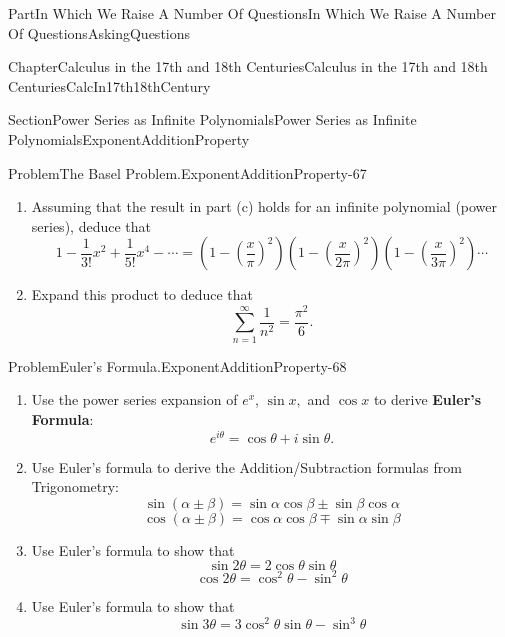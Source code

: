 \documentclass[oneside,10pt,]{book}
\newcommand{\terminology}[1]{\textbf{#1}}
\numberwithin{equation}{part}
\begin{document}
\begin{partptx}{Part}{In Which We Raise A Number Of Questions}{}{In Which We Raise A Number Of Questions}{}{}{AskingQuestions}
\begin{chapterptx}{Chapter}{Calculus in the 17th and 18th Centuries}{}{Calculus in the 17th and 18th Centuries}{}{}{CalcIn17th18thCentury}
\begin{sectionptx}{Section}{Power Series as Infinite Polynomials}{}{Power Series as Infinite Polynomials}{}{}{ExponentAdditionProperty}
\begin{problem}{Problem}{The Basel Problem.}{ExponentAdditionProperty-67}
\begin{enumerate}[font=\bfseries,label=(\alph*),ref=\alph*]
\begin{equation*}
p(x)=a_0\left(1-\frac{x}{r_1}\right)\left(1-\frac{x}{r_2}\right)\cdots\left(1-\frac{x}{r_n}\right)\text{.}
\end{equation*}
%
\item{}Assuming that the result in part (c) holds for an infinite polynomial (power series), deduce that%
\begin{equation*}
1-\frac{1}{3!}x^2+\frac{1}{5!}x^4-\cdots =
\left(1-\left(\frac{x}{\pi}\right)^2\right)
\left(1-\left(\frac{x}{2\pi}\right)^2\right)
\left(1-\left(\frac{x}{3\pi}\right)^2\right)\cdots
\end{equation*}
%
\item{}Expand this product to deduce that%
\begin{equation*}
\sum_{n=1}^\infty\frac{1}{n^2}=\frac{\pi^2}{6}.{}
\end{equation*}
%
\end{enumerate}%
\end{problem}
\begin{problem}{Problem}{Euler's Formula.}{ExponentAdditionProperty-68}%
\begin{enumerate}[font=\bfseries,label=(\alph*),ref=\alph*]%
\item{}Use the power series expansion of \(e^x\), \(\sin
x,\) and \(\cos x\) to derive \terminology{Euler's Formula}:%
\begin{equation*}
e^{i\theta} = \cos\theta+i\sin\theta.
\end{equation*}
%
\item{}Use Euler's formula to derive the Addition\slash{}Subtraction formulas from Trigonometry:%
\begin{equation*}
\sin(\alpha\pm\beta) = \sin\alpha\cos\beta\pm\sin\beta\cos\alpha
\end{equation*}
%
\begin{equation*}
\cos(\alpha\pm\beta) = \cos\alpha\cos\beta\mp\sin\alpha\sin\beta
\end{equation*}
%
\item{}Use Euler's formula to show that%
\begin{equation*}
\sin 2\theta = 2\cos\theta\sin\theta
\end{equation*}
%
\begin{equation*}
\cos 2\theta =\cos^2\theta-\sin^2\theta
\end{equation*}
%
\item{}Use Euler's formula to show that%
\begin{equation*}
\sin 3\theta = 3\cos^2\theta\sin\theta-\sin^3\theta

\end{equation*}
\end{enumerate}
\end{problem}
\end{sectionptx}
\end{chapterptx}
\end{partptx}
\end{document}
